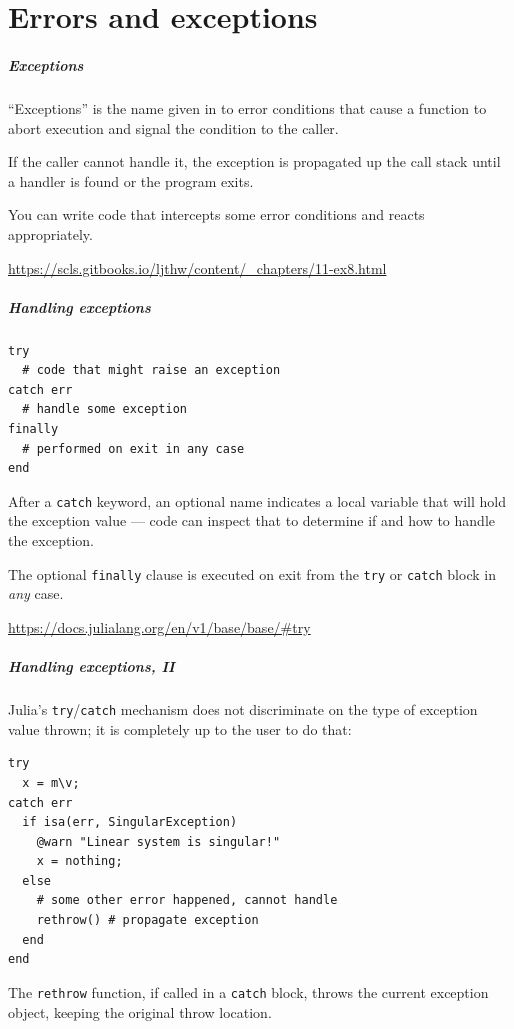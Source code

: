 \documentclass[english,serif,mathserif,xcolor=pdftex,dvipsnames,table]{beamer}
\begin{document}
\part{Errors and exceptions}
\begin{frame}[fragile]
  \frametitle{Exceptions}

  ``Exceptions'' is the name given in to error conditions that cause a
  function to abort execution and signal the condition to the caller.

  \+
  If the caller cannot handle it, the exception is propagated up the
  call stack until a handler is found or the program exits.

  \+
  You can write code that intercepts some error conditions and
  reacts appropriately.

  \+
  \begin{seealso}
    \url{https://scls.gitbooks.io/ljthw/content/_chapters/11-ex8.html}
  \end{seealso}
\end{frame}


\begin{frame}[fragile]
  \frametitle{Handling exceptions}
\begin{lstlisting}
try
  # code that might raise an exception
catch err
  # handle some exception
finally
  # performed on exit in any case
end
\end{lstlisting}

  \+
  After a \texttt{catch} keyword, an optional name indicates a local
  variable that will hold the exception value --- code can inspect
  that to determine if and how to handle the exception.

  \+
  The optional \lstinline|finally| clause is executed on exit from the
  \lstinline|try| or \lstinline|catch| block in \emph{any} case.

  \begin{references}
    \smaller
    \url{https://docs.julialang.org/en/v1/base/base/#try}
\end{references}
\end{frame}


\begin{frame}[fragile]
  \frametitle{Handling exceptions, II}
  \small

  Julia's \texttt{try}/\texttt{catch} mechanism does not discriminate
  on the type of exception value thrown; it is completely up to the
  user to do that:
\begin{lstlisting}
try
  x = m\v;
catch err
  if isa(err, SingularException)
    @warn "Linear system is singular!"
    x = nothing;
  else
    # some other error happened, cannot handle
    rethrow() # propagate exception
  end
end
\end{lstlisting}

  The \texttt{rethrow} function, if called in a \texttt{catch} block,
  throws the current exception object, keeping the original throw location.
\end{frame}
\end{document}

